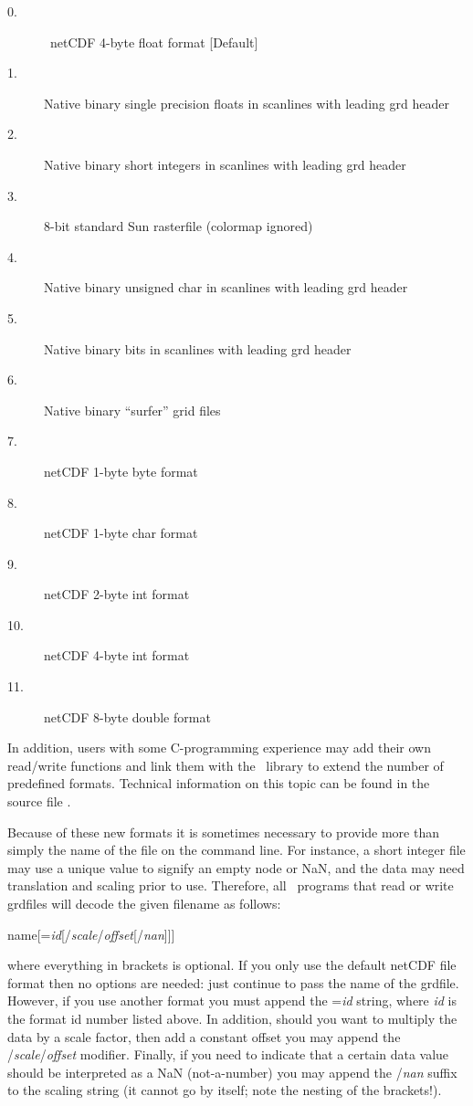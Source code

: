 \begin{description} 
\item[ 0.] \GMT\ netCDF 4-byte float format [Default] 
\item[ 1.] Native binary single precision floats in scanlines with leading grd header 
\item[ 2.] Native binary short integers in scanlines with leading grd header 
\item[ 3.] 8-bit standard Sun rasterfile (colormap ignored) 
\item[ 4.] Native binary unsigned char in scanlines with leading grd header 
\item[ 5.] Native binary bits in scanlines with leading grd header 
\item[ 6.] Native binary ``surfer'' grid files
\item[ 7.] netCDF 1-byte byte format
\item[ 8.] netCDF 1-byte char format
\item[ 9.] netCDF 2-byte int format
\item[10.] netCDF 4-byte int format
\item[11.] netCDF 8-byte double format
\end{description} 

In addition, users with some C-programming experience may add
their own read/write functions and link them with the \GMT\ library
to extend the number of predefined formats.  Technical information
on this topic can be found in the source file . 

Because of these new formats it is sometimes necessary to provide more
than simply the name of the file on the command line.  For instance,
a short integer file may use a unique value to signify an empty node
or NaN, and the data may need translation and scaling prior to use.
Therefore, all \GMT\ programs that read or write grdfiles will decode
the given filename as follows:

\vspace{\baselineskip} 

\par 	name[={\it id}[/{\it scale}/{\it offset}[/{\it nan}]]]\par 

\vspace{\baselineskip} 

\noindent
where everything in brackets is optional.  If you only use the default
netCDF file format then no options are needed: just continue to pass
the name of the grdfile.  However, if you use another format you must
append the ={\it id} string, where {\it id} is the format id number
listed above.  In addition, should you want to multiply the data by
a scale factor, then add a constant offset you may append the
/{\it scale}/{\it offset} modifier.  Finally, if you need to indicate
that a certain data value should be interpreted as a NaN (not-a-number)
you may append the /{\it nan} suffix to the scaling string (it cannot
go by itself; note the nesting of the brackets!). 

